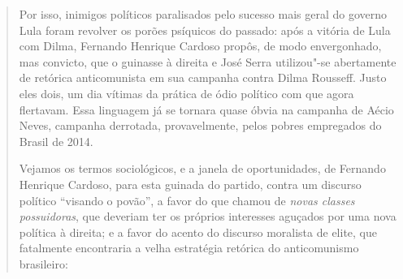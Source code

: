 \begin{quote}
Por isso, inimigos políticos paralisados pelo sucesso mais geral do
governo Lula foram revolver os porões psíquicos do passado: após a
vitória de Lula com Dilma, Fernando Henrique Cardoso propôs, de modo
envergonhado, mas convicto, que o  guinasse à direita e José Serra
utilizou"-se abertamente de retórica anticomunista em sua campanha contra
Dilma Rousseff. Justo eles dois, um dia vítimas da prática de ódio
político com que agora flertavam. Essa linguagem já se tornara quase
óbvia na campanha de Aécio Neves, campanha derrotada, provavelmente,
pelos pobres empregados do Brasil de 2014.

Vejamos os termos sociológicos, e a janela de oportunidades, de Fernando
Henrique Cardoso, para esta guinada do partido, contra um discurso
político ``visando o povão'', a favor do que chamou de \emph{novas
classes possuidoras}, que deveriam ter os próprios interesses aguçados
por uma nova política à direita; e a favor do acento do discurso
moralista de elite, que fatalmente encontraria a velha estratégia
retórica do anticomunismo brasileiro:


\end{quote}
